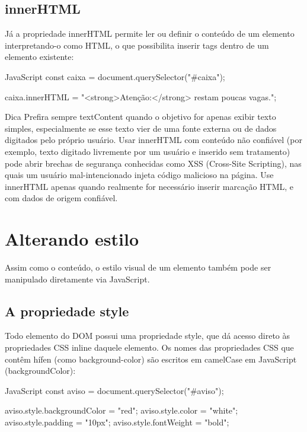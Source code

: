 \subsection{innerHTML}

Já a propriedade innerHTML permite ler ou definir o conteúdo de um elemento interpretando-o como HTML, o que possibilita inserir tags dentro de um elemento existente:

\begin{codebox}{JavaScript}
const caixa = document.querySelector("#caixa");

caixa.innerHTML = "<strong>Atenção:</strong> restam poucas vagas.";
\end{codebox}

\begin{infobox}{Dica}
Prefira sempre textContent quando o objetivo for apenas exibir texto simples, especialmente se esse texto vier de uma fonte externa ou de dados digitados pelo próprio usuário. Usar innerHTML com conteúdo não confiável (por exemplo, texto digitado livremente por um usuário e inserido sem tratamento) pode abrir brechas de segurança conhecidas como XSS (Cross-Site Scripting), nas quais um usuário mal-intencionado injeta código malicioso na página. Use innerHTML apenas quando realmente for necessário inserir marcação HTML, e com dados de origem confiável.
\end{infobox}

\section{Alterando estilo}

Assim como o conteúdo, o estilo visual de um elemento também pode ser manipulado diretamente via JavaScript.

\subsection{A propriedade style}

Todo elemento do DOM possui uma propriedade style, que dá acesso direto às propriedades CSS inline daquele elemento. Os nomes das propriedades CSS que contêm hífen (como background-color) são escritos em camelCase em JavaScript (backgroundColor):

\begin{codebox}{JavaScript}
const aviso = document.querySelector("#aviso");

aviso.style.backgroundColor = "red";
aviso.style.color = "white";
aviso.style.padding = "10px";
aviso.style.fontWeight = "bold";
\end{codebox}

